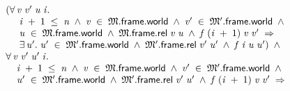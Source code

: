 \documentclass[letterpaper]{article}
\newenvironment{holmath}{\begin{displaymath}\begin{array}{l}}{\end{array}\end{displaymath}\ignorespacesafterend}
\begin{document}
\begin{holmath}
\;\;(\HOLSymConst{\HOLTokenForall{}}\HOLBoundVar{v}\;\HOLBoundVar{v\sp{\prime}}\;\HOLBoundVar{u}\;\HOLBoundVar{i}.\\
\;\;\;\;\;\;\;\HOLBoundVar{i}\;\HOLSymConst{\ensuremath{+}}\;\HOLNumLit{1}\;\HOLSymConst{\HOLTokenLeq{}}\;\HOLFreeVar{n}\;\HOLSymConst{\HOLTokenConj{}}\;\HOLBoundVar{v}\;\HOLSymConst{\HOLTokenIn{}}\;\HOLFreeVar{\ensuremath{\mathfrak{M}}}.\HOLFieldName{frame}.\HOLFieldName{world}\;\HOLSymConst{\HOLTokenConj{}}\;\HOLBoundVar{v\sp{\prime}}\;\HOLSymConst{\HOLTokenIn{}}\;\HOLFreeVar{\ensuremath{\mathfrak{M}'}}.\HOLFieldName{frame}.\HOLFieldName{world}\;\HOLSymConst{\HOLTokenConj{}}\\
\;\;\;\;\;\;\;\HOLBoundVar{u}\;\HOLSymConst{\HOLTokenIn{}}\;\HOLFreeVar{\ensuremath{\mathfrak{M}}}.\HOLFieldName{frame}.\HOLFieldName{world}\;\HOLSymConst{\HOLTokenConj{}}\;\HOLFreeVar{\ensuremath{\mathfrak{M}}}.\HOLFieldName{frame}.\HOLFieldName{rel}\;\HOLBoundVar{v}\;\HOLBoundVar{u}\;\HOLSymConst{\HOLTokenConj{}}\;\HOLFreeVar{f}\;(\HOLBoundVar{i}\;\HOLSymConst{\ensuremath{+}}\;\HOLNumLit{1})\;\HOLBoundVar{v}\;\HOLBoundVar{v\sp{\prime}}\;\HOLSymConst{\HOLTokenImp{}}\\
\;\;\;\;\;\;\;\HOLSymConst{\HOLTokenExists{}}\HOLBoundVar{u\sp{\prime}}.\;\HOLBoundVar{u\sp{\prime}}\;\HOLSymConst{\HOLTokenIn{}}\;\HOLFreeVar{\ensuremath{\mathfrak{M}'}}.\HOLFieldName{frame}.\HOLFieldName{world}\;\HOLSymConst{\HOLTokenConj{}}\;\HOLFreeVar{\ensuremath{\mathfrak{M}'}}.\HOLFieldName{frame}.\HOLFieldName{rel}\;\HOLBoundVar{v\sp{\prime}}\;\HOLBoundVar{u\sp{\prime}}\;\HOLSymConst{\HOLTokenConj{}}\;\HOLFreeVar{f}\;\HOLBoundVar{i}\;\HOLBoundVar{u}\;\HOLBoundVar{u\sp{\prime}})\;\HOLSymConst{\HOLTokenConj{}}\\
\;\;\HOLSymConst{\HOLTokenForall{}}\HOLBoundVar{v}\;\HOLBoundVar{v\sp{\prime}}\;\HOLBoundVar{u\sp{\prime}}\;\HOLBoundVar{i}.\\
\;\;\;\;\;\;\HOLBoundVar{i}\;\HOLSymConst{\ensuremath{+}}\;\HOLNumLit{1}\;\HOLSymConst{\HOLTokenLeq{}}\;\HOLFreeVar{n}\;\HOLSymConst{\HOLTokenConj{}}\;\HOLBoundVar{v}\;\HOLSymConst{\HOLTokenIn{}}\;\HOLFreeVar{\ensuremath{\mathfrak{M}}}.\HOLFieldName{frame}.\HOLFieldName{world}\;\HOLSymConst{\HOLTokenConj{}}\;\HOLBoundVar{v\sp{\prime}}\;\HOLSymConst{\HOLTokenIn{}}\;\HOLFreeVar{\ensuremath{\mathfrak{M}'}}.\HOLFieldName{frame}.\HOLFieldName{world}\;\HOLSymConst{\HOLTokenConj{}}\\
\;\;\;\;\;\;\HOLBoundVar{u\sp{\prime}}\;\HOLSymConst{\HOLTokenIn{}}\;\HOLFreeVar{\ensuremath{\mathfrak{M}'}}.\HOLFieldName{frame}.\HOLFieldName{world}\;\HOLSymConst{\HOLTokenConj{}}\;\HOLFreeVar{\ensuremath{\mathfrak{M}'}}.\HOLFieldName{frame}.\HOLFieldName{rel}\;\HOLBoundVar{v\sp{\prime}}\;\HOLBoundVar{u\sp{\prime}}\;\HOLSymConst{\HOLTokenConj{}}\;\HOLFreeVar{f}\;(\HOLBoundVar{i}\;\HOLSymConst{\ensuremath{+}}\;\HOLNumLit{1})\;\HOLBoundVar{v}\;\HOLBoundVar{v\sp{\prime}}\;\HOLSymConst{\HOLTokenImp{}}\\

\end{holmath}
\end{document}
